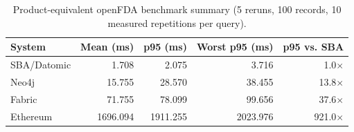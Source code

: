 \begin{table}[t]
\centering
\caption{Product-equivalent openFDA benchmark summary (5 reruns, 100 records, 10 measured repetitions per query).}
\label{tab:openfda-product-equivalent}
\begin{tabular}{lrrrr}
\toprule
System & Mean (ms) & p95 (ms) & Worst p95 (ms) & p95 vs. SBA \\
\midrule
SBA/Datomic & 1.708 & 2.075 & 3.716 & 1.0$\times$ \\
Neo4j & 15.755 & 28.570 & 38.455 & 13.8$\times$ \\
Fabric & 71.755 & 78.099 & 99.656 & 37.6$\times$ \\
Ethereum & 1696.094 & 1911.255 & 2023.976 & 921.0$\times$ \\
\bottomrule
\end{tabular}
\end{table}
